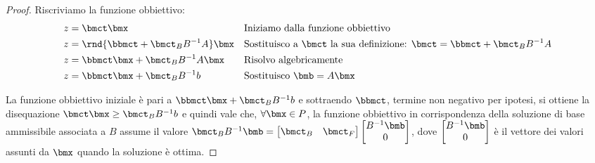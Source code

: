 \documentclass[\main/main.tex]{subfiles}
\begin{document}
\begin{proof}
  Riscriviamo la funzione obbiettivo:
  \begin{align*}
    z & = \bmct \bmx                          &  & \text{Iniziamo dalla funzione obbiettivo}                                           \\
    z & = \rnd{\bbmct + \bmct_B B^{-1}A} \bmx &  & \text{Sostituisco a $\bmct$ la sua definizione: $\bmct = \bbmct + \bmct_B B^{-1}A$} \\
    z & = \bbmct\bmx + \bmct_B B^{-1}A\bmx    &  & \text{Risolvo algebricamente}                                                       \\
    z & = \bbmct\bmx + \bmct_B B^{-1}b        &  & \text{Sostituisco $\bmb = A\bmx$}                                                   \\
  \end{align*}

  La funzione obbiettivo iniziale è pari a $\bbmct\bmx + \bmct_B B^{-1}b$ e sottraendo $\bbmct$, termine non negativo per ipotesi, si ottiene la disequazione $\bmct\bmx \geq \bmct_B B^{-1}b$ e quindi vale che, $\forall \bmx \in P$, la funzione obbiettivo in corrispondenza della soluzione di base ammissibile associata a $B$ assume il valore $
    \bmct_BB^{-1}\bmb = \begin{bmatrix}
      \bmct_B & \bmct_F
    \end{bmatrix}
    \begin{bmatrix}
      B^{-1}\bmb \\
      0
    \end{bmatrix}
  $, dove $\begin{bmatrix}
      B^{-1}\bmb \\
      0
    \end{bmatrix}$ è il vettore dei valori assunti da $\bmx$ quando la soluzione è ottima.

\end{proof}
\end{document}
